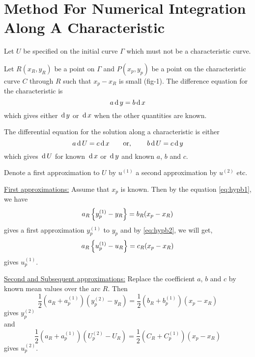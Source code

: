 \documentclass[../main-sheet.tex]{subfiles}
\begin{document}
\section{Method For Numerical Integration Along A Characteristic}
Let \(U\) be specified on the initial curve \(\Gamma\) which must not be a characteristic curve.

\begin{center}
\end{center}
Let \(R(x_R,y_R)\) be a point on \(\Gamma\) and \(P(x_p,y_p)\) be a point on the characteristic curve \(C\) through \(R\) such that \(x_p-x_R\) is small (fig-1). The difference equation for the characteristic is
\begin{equation}
    a\,\mathrm{d}\, y=b\,\mathrm{d}\, x \label{eq:hypb1}
\end{equation}
which gives either \(\,\mathrm{d}\, y\) or \(\,\mathrm{d}\, x\) when the other quantities are known.

The differential equation for the solution along a characteristic is either
\begin{equation}
    a\,\mathrm{d}\, U=c\,\mathrm{d}\, x\qquad \text{or, }\qquad b\,\mathrm{d}\, U=c\,\mathrm{d}\, y\label{eq:hypb2}
\end{equation}
which gives \(\,\mathrm{d}\, U\) for known \(\,\mathrm{d}\, x\) or \(\,\mathrm{d}\, y\) and known \(a\), \(b\) and \(c\).

Denote a first approximation to \(U\) by \(u^{(1)}\) a second approximation by \(u^{(2)}\) etc.

\underline{First approximations:} Assume that \(x_p\) is known. Then by the equation \eqref{eq:hypb1}, we have
\[a_R\left\{y_p^{(1)}-y_R\right\}=b_R(x_p-x_R)\]
gives a first approximation \(y_p^{(1)}\) to \(y_p\) and by \eqref{eq:hypb2}, we will get,
\[a_R\left\{u_p^{(1)}-u_R\right\}=c_R(x_p-x_R)\]
gives \(u_p^{(1)}\).

\underline{Second and Subsequent approximations:} Replace the coefficient \(a\), \(b\) and \(c\) by known mean values over the arc \(R\). Then
\[\frac{1}{2}\left( a_R+a_p^{(1)} \right)\left( y_p^{(2)}-y_R \right)=\frac{1}{2}\left( b_R+b_p^{(1)} \right)(x_p-x_R)\]
gives \(y_p^{(2)}\)\\
and
\[\frac{1}{2}\left( a_R+a_p^{(1)} \right)\left( U_p^{(2)}-U_R \right)=\frac{1}{2}\left( C_R+C_p^{(1)} \right)(x_p-x_R)\]
gives \(u_p^{(2)}\).
\end{document}
